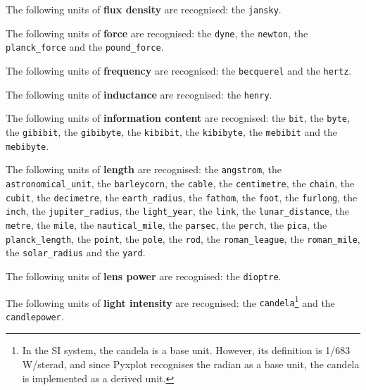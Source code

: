 \noindent The following units of {\bf flux density} are recognised:\newline
\noindent the {\tt jansky}.\vspace{5mm}

\noindent The following units of {\bf force} are recognised:\newline
\noindent the {\tt dyne}, the {\tt newton}, the {\tt planck\_\-force} and the {\tt pound\_\-force}.\vspace{5mm}

\noindent The following units of {\bf frequency} are recognised:\newline
\noindent the {\tt becquerel} and the {\tt hertz}.\vspace{5mm}

\noindent The following units of {\bf inductance} are recognised:\newline
\noindent the {\tt henry}.\vspace{5mm}

\noindent The following units of {\bf information content} are recognised:\newline
\noindent the {\tt bit}, the {\tt byte}, the {\tt gibibit}, the {\tt gibibyte}, the {\tt kibibit}, the {\tt kibibyte}, the {\tt mebibit} and the {\tt mebibyte}.\vspace{5mm}

\noindent The following units of {\bf length} are recognised:\newline
\noindent the {\tt angstrom}, the {\tt astronomical\_\-unit}, the {\tt barleycorn}, the {\tt cable}, the {\tt centimetre}, the {\tt chain}, the {\tt cubit}, the {\tt decimetre}, the {\tt earth\_\-radius}, the {\tt fathom}, the {\tt foot}, the {\tt furlong}, the {\tt inch}, the {\tt jupiter\_\-radius}, the {\tt light\_\-year}, the {\tt link}, the {\tt lunar\_\-distance}, the {\tt metre}, the {\tt mile}, the {\tt nautical\_\-mile}, the {\tt parsec}, the {\tt perch}, the {\tt pica}, the {\tt planck\_\-length}, the {\tt point}, the {\tt pole}, the {\tt rod}, the {\tt roman\_\-league}, the {\tt roman\_\-mile}, the {\tt solar\_\-radius} and the {\tt yard}.\vspace{5mm}

\noindent The following units of {\bf lens power} are recognised:\newline
\noindent the {\tt dioptre}.\vspace{5mm}

\noindent The following units of {\bf light intensity} are recognised:\newline
\noindent the {\tt candela}\footnote{In the SI system, the candela is a base unit. However, its definition is 1/683\,W/sterad, and since Pyxplot recognises the radian as a base unit, the candela is implemented as a derived unit.} and the {\tt candlepower}.\vspace{5mm}

